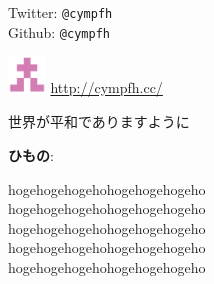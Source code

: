 \vspace*{40mm}
\hspace*{10mm}
\begin{minipage}{0.8\paperwidth}
    Twitter: {\tt @cympfh}\\
    Github: {\tt @cympfh}

\includegraphics[width=10mm,bb=0 0 379 376]{resources/cympfh.png}
    {\url{http://cympfh.cc/}}

    世界が平和でありますように
\end{minipage}

\vspace*{50mm}
\hspace*{30mm}
\begin{minipage}{0.8\paperwidth}
    {\bf ひもの}:

hogehogehogehohogehogehogeho\\
hogehogehogehohogehogehogeho\\
hogehogehogehohogehogehogeho\\
hogehogehogehohogehogehogeho\\
hogehogehogehohogehogehogeho\\
\end{minipage}

